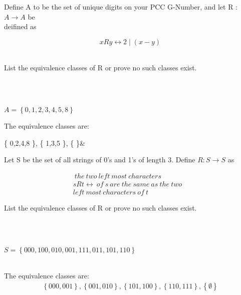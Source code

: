 \documentclass[10pt,letterpaper, cm]{hmcpset}
\begin{document}
\begin{problem}[6]
Define A to be the set of unique digits on your PCC G-Number, and let R :$A\rightarrow A$ be\\
deifined as\\
\begin{center}
  \begin{equation*}
    xRy \leftrightarrow 2\mid(x-y)
  \end{equation*}
\end{center}\\
List the equivalence classes of R or prove no such classes exist.
\end{problem}\\
\\
\begin{center}
  $ A =  \left\{ 0,1,2,3,4,5,8 \right\}$\\
\end{center}
 The equivalence classes are:\\
 \begin{center}
   \left\{ 0,2,4,8 \right\},
   \left\{ 1,3,5 \right\},
   \left\{ \emptyset \right\}&
 \end{center}
\newpage
\begin{problem}[7]
  Let S be the set of all strings of 0's and 1's of length 3. Define $ R:S \rightarrow S$ as\\ 
  \begin{center}
    \begin{align*}
    ~the~two~left~most~characters& \\
      sRt \leftrightarrow~
      of~s~are~the~same~as~the~two\\
      left~most~characters~of~t 
    \end{align*}
  \end{center}
  List the equivalence classes of R or prove no such classes exist.
\end{problem}\\
\\
\begin{center}
  $ S=\left\{ 000, 100, 010, 001, 111, 011, 101, 110 \right\}$\\
\end{center}
\\
 The equivalence classes are:
\begin{align*}
   \left\{ 000, 001 \right\},
   \left\{ 001, 010 \right\},
   \left\{ 101, 100 \right\},
 \left\{ 110, 111 \right\},
 \left\{ \emptyset \right\} 
\end{align*}
\end{document}
